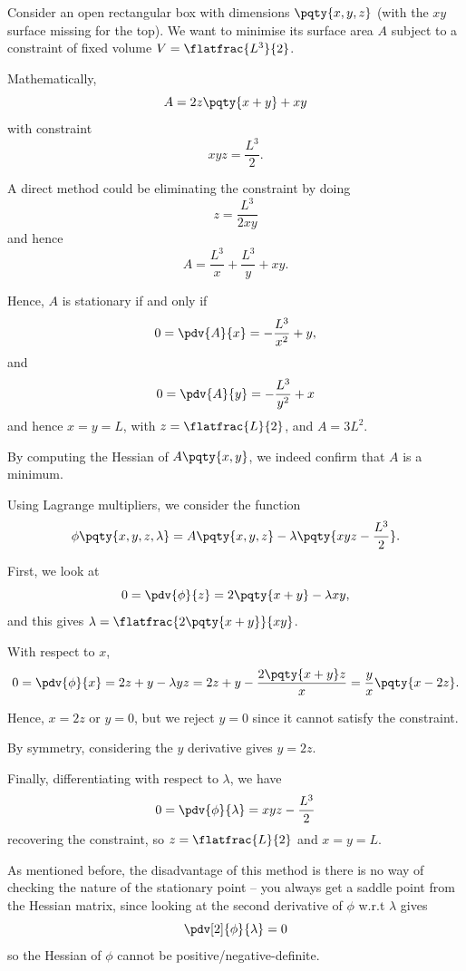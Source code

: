 \begin{example}
    Consider an open rectangular box with dimensions \(\pqty{x, y, z}\) (with the \(xy\) surface missing for the top). We want to minimise its surface area \(A\) subject to a constraint of fixed volume \(V = \flatfrac{L^3}{2}\).
        
    Mathematically,
    \[
        A = 2z \pqty{x + y} + xy
    \]
    with constraint
    \[
        xyz = \frac{L^3}{2}.
    \]

    A direct method could be eliminating the constraint by doing
    \[
        z = \frac{L^3}{2xy}
    \]
    and hence
    \[
        A = \frac{L^3}{x} + \frac{L^3}{y} + xy.
    \]

    Hence, \(A\) is stationary if and only if
    \[
        0 = \pdv{A}{x} = - \frac{L^3}{x^2} + y,
    \]
    and
    \[
        0 = \pdv{A}{y} = - \frac{L^3}{y^2} + x
    \]
    and hence \(x = y = L\), with \(z = \flatfrac{L}{2}\), and \(A = 3 L^2\).

    By computing the Hessian of \(A\pqty{x, y}\), we indeed confirm that \(A\) is a minimum.

    Using Lagrange multipliers, we consider the function
    \[
        \phi\pqty{x, y, z, \lambda} = A\pqty{x, y, z} - \lambda \pqty{xyz - \frac{L^3}{2}}.
    \]

    First, we look at
    \[
        0 = \pdv{\phi}{z} = 2\pqty{x + y} - \lambda xy,
    \]
    and this gives \(\lambda = \flatfrac{2 \pqty{x + y}}{xy}\).

    With respect to \(x\),
    \[
        0 = \pdv{\phi}{x} = 2z + y - \lambda yz = 2z + y - \frac{2 \pqty{x + y} z}{x} = \frac{y}{x} \pqty{x - 2z}.
    \]
    
    Hence, \(x = 2z\) or \(y = 0\), but we reject \(y = 0\) since it cannot satisfy the constraint.

    By symmetry, considering the \(y\) derivative gives \(y = 2z\).

    Finally, differentiating with respect to \(\lambda\), we have
    \[
        0 = \pdv{\phi}{\lambda} = xyz - \frac{L^3}{2}
    \]
    recovering the constraint, so \(z = \flatfrac{L}{2}\) and \(x = y = L\).
\end{example}

As mentioned before, the disadvantage of this method is there is no way of checking the nature of the stationary point -- you always get a saddle point from the Hessian matrix, since looking at the second derivative of \(\phi\) w.r.t \(\lambda\) gives
\[
    \pdv[2]{\phi}{\lambda} = 0
\]
so the Hessian of \(\phi\) cannot be positive/negative-definite.

